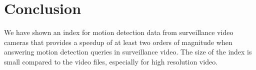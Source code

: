 \begin{comment}
\begin{table}
    \caption{Index size comparison for students scenario, for different histogram packing strategies and frames stored per file.}\label{res:frames-packing}
	\centering
    \begin{tabular}{ r rrrr }
		~ & \multicolumn{4}{c}{\textbf{Index Size (MB) / Packing Strategy}} \\
		\cline{2-5}
	    \textbf{Frames/file} & \texttt{linear} & \texttt{binned} & \texttt{reg-linear} & \texttt{reg-binned} \\  \hline\noalign{\smallskip}
		1   		& 5.5 & 7.8 & 5.5 & 5.5         \\
	    4			& 5.5 & 7.8 & 5.4 & 6.3         \\
	    16     		& 5.5 & 8.9 & 5.3 & 6.5         \\\noalign{\smallskip}
        \hline
	   \end{tabular}
\end{table}
\end{comment}


\section{Conclusion}
We have shown an index for motion detection data from surveillance video cameras that provides a speedup of at least two orders of magnitude when answering motion detection queries in surveillance video. The size of the index is small compared to the video files, especially for high resolution video.


%
%

